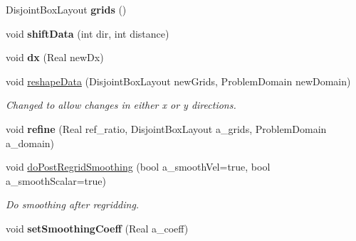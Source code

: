 \begin{DoxyCompactItemize}
\item 
\hypertarget{class_a_m_r_level_mushy_layer_afbb2adb1dd99e2b69bcb58d5395fe3b5}{Disjoint\-Box\-Layout {\bfseries grids} ()}\label{class_a_m_r_level_mushy_layer_afbb2adb1dd99e2b69bcb58d5395fe3b5}

\item 
\hypertarget{class_a_m_r_level_mushy_layer_a03805c646cd80400874095a6960545cd}{void {\bfseries shift\-Data} (int dir, int distance)}\label{class_a_m_r_level_mushy_layer_a03805c646cd80400874095a6960545cd}

\item 
\hypertarget{class_a_m_r_level_mushy_layer_ab8b44ec14b5ddfb4d42358ae2a2f72ea}{void {\bfseries dx} (Real new\-Dx)}\label{class_a_m_r_level_mushy_layer_ab8b44ec14b5ddfb4d42358ae2a2f72ea}

\item 
\hypertarget{class_a_m_r_level_mushy_layer_a8032590f0d7a8160dc1a56151648f7c8}{void \hyperlink{class_a_m_r_level_mushy_layer_a8032590f0d7a8160dc1a56151648f7c8}{reshape\-Data} (Disjoint\-Box\-Layout new\-Grids, Problem\-Domain new\-Domain)}\label{class_a_m_r_level_mushy_layer_a8032590f0d7a8160dc1a56151648f7c8}

\begin{DoxyCompactList}\small\item\em Changed to allow changes in either x or y directions. \end{DoxyCompactList}\item 
\hypertarget{class_a_m_r_level_mushy_layer_a1afe0bf8c7646e56849d90da107afe1d}{void {\bfseries refine} (Real ref\-\_\-ratio, Disjoint\-Box\-Layout a\-\_\-grids, Problem\-Domain a\-\_\-domain)}\label{class_a_m_r_level_mushy_layer_a1afe0bf8c7646e56849d90da107afe1d}

\item 
\hypertarget{class_a_m_r_level_mushy_layer_aaeccaad92142479afdc82e3b127be495}{void \hyperlink{class_a_m_r_level_mushy_layer_aaeccaad92142479afdc82e3b127be495}{do\-Post\-Regrid\-Smoothing} (bool a\-\_\-smooth\-Vel=true, bool a\-\_\-smooth\-Scalar=true)}\label{class_a_m_r_level_mushy_layer_aaeccaad92142479afdc82e3b127be495}

\begin{DoxyCompactList}\small\item\em Do smoothing after regridding. \end{DoxyCompactList}\item 
\hypertarget{class_a_m_r_level_mushy_layer_a3c89f5bbdbe135424e8cdfd75fc03061}{void {\bfseries set\-Smoothing\-Coeff} (Real a\-\_\-coeff)}\label{class_a_m_r_level_mushy_layer_a3c89f5bbdbe135424e8cdfd75fc03061}


\end{DoxyCompactItemize}
